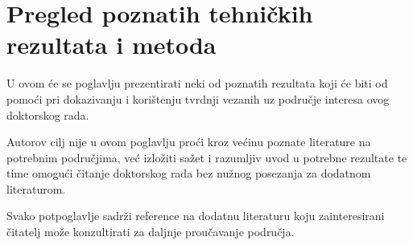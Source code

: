 \chapter{Pregled poznatih tehničkih rezultata i metoda}

U ovom će se poglavlju prezentirati neki od poznatih
rezultata koji će biti od pomoći pri
dokazivanju i korištenju tvrdnji vezanih uz područje
interesa ovog doktorskog rada.

Autorov cilj nije 
u ovom poglavlju proći kroz većinu poznate literature
na potrebnim područjima, već izložiti
sažet i razumljiv uvod u potrebne rezultate
te time omogući čitanje doktorskog rada
bez nužnog posezanja za dodatnom literaturom.

Svako potpoglavlje sadrži reference
na dodatnu literaturu koju
zainteresirani čitatelj može konzultirati
za daljnje proučavanje područja.







 
